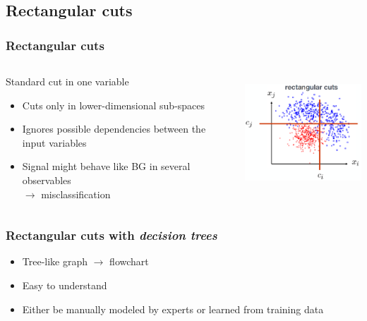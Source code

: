 \documentclass{beamer}
\begin{document}

\subsection{Rectangular cuts} %
\begin{frame}
    \frametitle{Rectangular cuts}
    \begin{columns}[T] %
        \begin{column}{.48\textwidth}
            \vspace*{-10mm}
            Standard cut in one variable
            \begin{itemize}
                \item<1-> Cuts only in lower-dimensional sub-spaces
                \item<2-> Ignores possible dependencies between the input variables
                \item<3-> Signal might behave like BG in several observables\\ $\to$ misclassification
            \end{itemize}
        \end{column}%
        \hfill%
        \begin{column}{.48\textwidth}
            \vspace*{-10mm}
            \raggedright\includegraphics[height=4.3cm,keepaspectratio]{pics/mva_cuts_rectangular.png}%
            
        \end{column}%
    \end{columns}

\end{frame}


\begin{frame}
    \frametitle{Rectangular cuts with \emph{decision trees}}
    \vspace*{-7mm}
    \begin{itemize}
        \item Tree-like graph $\to$ flowchart
        \item Easy to understand
        \item Either be manually modeled by experts or learned from training data
    \end{itemize}
\end{frame}
\end{document}
